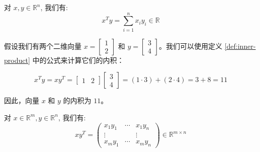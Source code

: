 \documentclass[lang=cn,newtx,10pt,scheme=chinese]{elegantbook}
\begin{document}
\begin{definition}[内积] \label{def:inner-product} 
对 $x, y \in \mathbb{R}^n$, 我们有:
$$
x^T y=\sum_{i=1}^n x_i y_i \in \mathbb{R}
$$
\end{definition}

\begin{exercise}\label{exer:01}
假设我们有两个二维向量 $x = \begin{bmatrix} 1 \\ 2 \end{bmatrix}$ 和 $y = \begin{bmatrix} 3 \\ 4 \end{bmatrix}$。我们可以使用定义 \ref{def:inner-product} 中的公式来计算它们的内积：

\[
x^T y = x y^T = \begin{bmatrix} 1 & 2 \end{bmatrix} \begin{bmatrix} 3 \\ 4 \end{bmatrix} = (1 \cdot 3) + (2 \cdot 4) = 3 + 8 = 11
\]

因此，向量 $x$ 和 $y$ 的内积为 $11$。
\end{exercise}

\begin{definition}[外积] \label{def:outer-product} 
对 $x \in \mathbb{R}^m, y \in \mathbb{R}^n$, 我们有:
$$
x y^T=\left(\begin{array}{ccc}
x_1 y_1 & \cdots & x_1 y_n \\
\vdots & & \vdots \\
x_m y_1 & \cdots & x_m y_n
\end{array}\right) \in \mathbb{R}^{m \times n}
$$
\end{definition}
\end{document}
